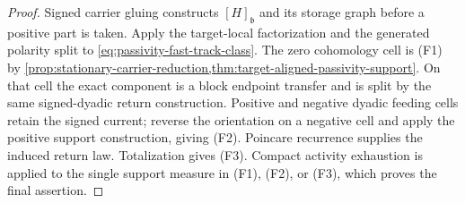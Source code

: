 \documentclass[11pt]{article}
\numberwithin{section}{part}
\theoremstyle{plain}
\theoremstyle{definition}
\theoremstyle{remark}
\begin{document}
\begin{proof}
Signed carrier gluing constructs \([H]_{\mathfrak b}\) and its storage graph
before a positive part is taken.  Apply the target-local factorization and
the generated polarity split to \eqref{eq:passivity-fast-track-class}.  The
zero cohomology cell is \textup{(F1)} by
\cref{prop:stationary-carrier-reduction,thm:target-aligned-passivity-support}.
On that cell the exact component is a block endpoint transfer and is split by
the same signed-dyadic return construction.  Positive and negative dyadic
feeding cells retain the signed current; reverse the orientation on a
negative cell and apply the positive support construction, giving
\textup{(F2)}.  Poincare recurrence supplies the induced return law.
Totalization gives \textup{(F3)}.  Compact activity exhaustion is applied to
the single support measure in \textup{(F1)}, \textup{(F2)}, or
\textup{(F3)}, which proves the final assertion.
\end{proof}
\end{document}
